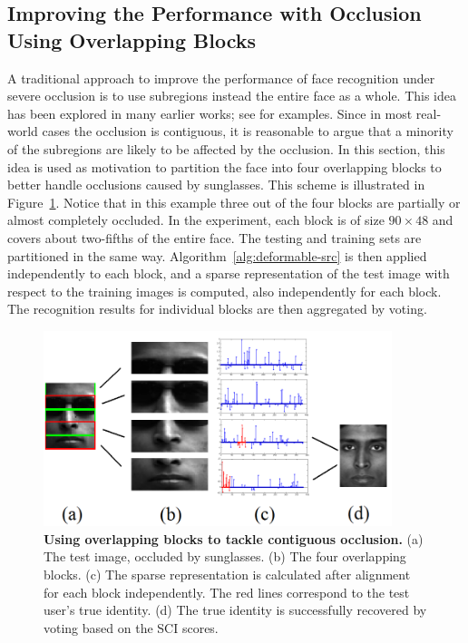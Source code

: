 \subsection{Improving the Performance with Occlusion Using Overlapping Blocks}
\label{sec:overlapping_blocks}
%
A traditional approach to improve the performance of face recognition under
severe occlusion is to use subregions instead the entire face as a whole. This
idea has been explored in many earlier works; see \cite{Pentland1994-CVPR,
Wright2009-PAMI} for examples. Since in most real-world cases the occlusion is
contiguous, it is reasonable to argue that a minority of the subregions are
likely to be affected by the occlusion. In this section, this idea is used
as motivation to 
partition the face into four overlapping blocks to better handle
occlusions caused by sunglasses. This scheme is illustrated in Figure~\ref{fig:occ-block}. Notice
that in this example three out of the four blocks are partially or almost
completely occluded. In the experiment, each block is of size $90\times 48$ and
covers about two-fifths of the entire face. The testing and training sets are
partitioned in the same way. 
Algorithm~\ref{alg:deformable-src} is then applied independently to each block,
and a sparse representation of the test image with respect to the training images
is computed, also independently for each block.
The recognition results for individual blocks are then aggregated by voting.

\begin{figure}
\centering
\includegraphics[width=4in]{figures_pami/occ_block.png}

\caption{\small{\bf Using overlapping blocks to tackle contiguous occlusion.}
(a) The test image, occluded by sunglasses. (b) The four overlapping blocks.
(c) The sparse representation is calculated after alignment for each block
independently. The red lines correspond to the test user's true identity. (d)
The true identity is successfully recovered by voting based on the SCI scores.}
\label{fig:occ-block} 
\end{figure}

